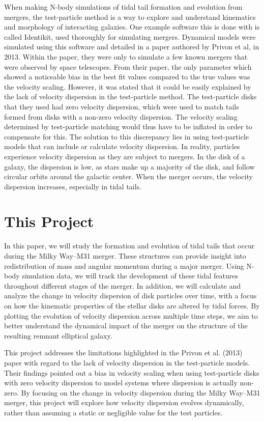 \documentclass[fleqn,usenatbib]{mnras}
\begin{document}
When making N-body simulations of tidal tail formation and evolution from mergers, the test-particle method is a way to explore and understand kinematics and morphology of interacting galaxies. One example software this is done with is called Identikit, used thoroughly for simulating mergers. Dynamical models were simulated using this software and detailed in a paper authored by Privon et al, in 2013.  Within the paper, they were only to simulate a few known mergers that were observed by space telescopes. From their paper, the only parameter which showed a noticeable bias in the best fit values compared to the true values was the velocity scaling. However, it was stated that it could be easily explained by the lack of velocity dispersion in the test-particle method. The test-particle disks that they used had zero velocity dispersion, which were used to match tails formed from disks with a non-zero velocity dispersion. The velocity scaling determined by test-particle matching would thus have to be inflated in order to compensate for this.  \cite{Privon_2013} The solution to this discrepancy lies in using test-particle models that can include or calculate velocity dispersion. In reality, particles experience velocity dispersion as they are subject to mergers. In the disk of a galaxy, the dispersion is low, as stars make up a majority of the disk, and follow circular orbits around the galactic center. When the merger occurs, the velocity dispersion increases, especially in tidal tails. 


\section{This Project}
In this paper, we will study the formation and evolution of tidal tails that occur during the Milky Way–M31 merger. These structures can provide insight into redistribution of mass and angular momentum during a major merger. Using N-body simulation data, we will track the development of these tidal features throughout different stages of the merger. In addition, we will calculate and analyze the change in velocity dispersion of disk particles over time, with a focus on how the kinematic properties of the stellar disks are altered by tidal forces. By plotting the evolution of velocity dispersion across multiple time steps, we aim to better understand the dynamical impact of the merger on the structure of the resulting remnant elliptical galaxy.

This project addresses the limitations highlighted in the Privon et al. (2013) paper with regard to the lack of velocity dispersion in the test-particle models. Their findings pointed out a bias in velocity scaling when using test-particle disks with zero velocity dispersion to model systems where dispersion is actually non-zero. By focusing on the change in velocity dispersion during the Milky Way–M31 merger, this project will explore how velocity dispersion evolves dynamically, rather than assuming a static or negligible value for the test particles. 
\end{document}

